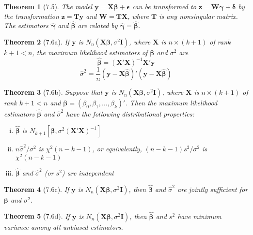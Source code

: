 \documentclass{article}
\newtheorem{theorem}{Theorem}[section]
\begin{document}
\begin{theorem}[7.5]
The model $\mathbf{y} = \mathbf{X}\boldsymbol{\beta} + \boldsymbol{\epsilon}$ can be transformed to $\mathbf{z} = \mathbf{W}\boldsymbol{\gamma} + \boldsymbol{\delta}$ by the transformation $\mathbf{z} = \mathbf{T}\mathbf{y}$ and $\mathbf{W} = \mathbf{T}\mathbf{X}$, where $\mathbf{T}$ is any nonsingular matrix. The estimators $\hat{\boldsymbol{\gamma}}$ and $\hat{\boldsymbol{\beta}}$ are related by $\hat{\boldsymbol{\gamma}} = \hat{\boldsymbol{\beta}}$.
\end{theorem}

\begin{theorem}[7.6a]
If $\mathbf{y}$ is $N_n(\mathbf{X}\boldsymbol{\beta}, \sigma^2\mathbf{I})$, where $\mathbf{X}$ is $n \times (k+1)$ of rank $k+1 < n$, the maximum likelihood estimators of $\boldsymbol{\beta}$ and $\sigma^2$ are
\[\hat{\boldsymbol{\beta}} = (\mathbf{X}'\mathbf{X})^{-1}\mathbf{X}'\mathbf{y}\]
\[\hat{\sigma}^2 = \frac{1}{n}(\mathbf{y} - \mathbf{X}\hat{\boldsymbol{\beta}})' (\mathbf{y} - \mathbf{X}\hat{\boldsymbol{\beta}})\]
\end{theorem}

\begin{theorem}[7.6b]
Suppose that $\mathbf{y}$ is $N_n(\mathbf{X}\boldsymbol{\beta}, \sigma^2\mathbf{I})$, where $\mathbf{X}$ is $n \times (k+1)$ of rank $k+1 < n$ and $\boldsymbol{\beta} = (\beta_0, \beta_1, \ldots, \beta_k)'$. Then the maximum likelihood estimators $\hat{\boldsymbol{\beta}}$ and $\hat{\sigma}^2$ have the following distributional properties:
\begin{enumerate}[(i)]
\item $\hat{\boldsymbol{\beta}}$ is $N_{k+1}[\boldsymbol{\beta}, \sigma^2(\mathbf{X}'\mathbf{X})^{-1}]$
\item $n\hat{\sigma}^2/\sigma^2$ is $\chi^2(n-k-1)$, or equivalently, $(n-k-1)s^2/\sigma^2$ is $\chi^2(n-k-1)$
\item $\hat{\boldsymbol{\beta}}$ and $\hat{\sigma}^2$ (or $s^2$) are independent
\end{enumerate}
\end{theorem}

\begin{theorem}[7.6c]
If $\mathbf{y}$ is $N_n(\mathbf{X}\boldsymbol{\beta}, \sigma^2\mathbf{I})$, then $\hat{\boldsymbol{\beta}}$ and $\hat{\sigma}^2$ are jointly sufficient for $\boldsymbol{\beta}$ and $\sigma^2$.
\end{theorem}

\begin{theorem}[7.6d]
If $\mathbf{y}$ is $N_n(\mathbf{X}\boldsymbol{\beta}, \sigma^2\mathbf{I})$, then $\hat{\boldsymbol{\beta}}$ and $s^2$ have minimum variance among all unbiased estimators.
\end{theorem}
\end{document}

